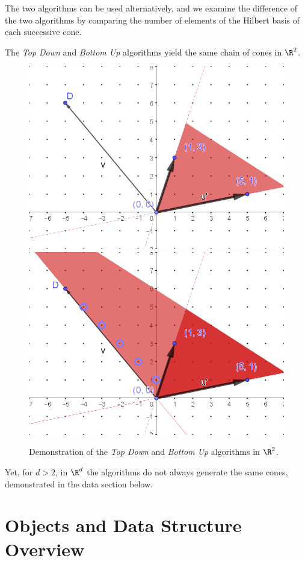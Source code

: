 \documentclass{TC}
\begin{document}
The two algorithms can be used alternatively, and we examine the difference of the two algorithms by comparing the number of elements of the Hilbert basis of each successive cone. 


\begin{lemma}
The \emph{Top Down} and \emph{Bottom Up} algorithms yield the same chain of cones in $\R^2$.
\end{lemma} 


\begin{figure}[h]
\begin{multicols}{2}
\includegraphics[width=.49\textwidth]{SimpleCone}
\includegraphics[width=.49\textwidth]
{SimpleCone2}
\end{multicols}

\caption{Demonstration of the \emph{Top Down} and \emph{Bottom Up} algorithms in $\R^2$.}
\end{figure}

Yet, for $d > 2$, in $\R^d$ the algorithms do not always generate the same cones, demonstrated in the data section below.




\section{Objects and Data Structure Overview}
\end{document}
